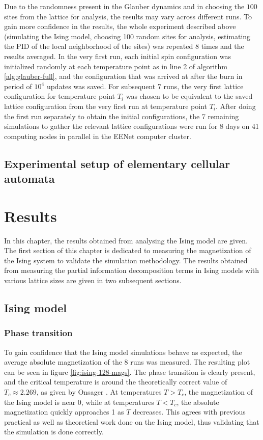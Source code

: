\documentclass[12pt]{article}
\begin{document}
Due to the randomness present in the Glauber dynamics and in choosing the $100$ sites from the lattice for analysis, the results may vary across different runs. To gain more confidence in the results, the whole experiment described above (simulating the Ising model, choosing 100 random sites for analysis, estimating the PID of the local neighborhood of the sites) was repeated 8 times and the results averaged. In the very first run, each initial spin configuration was initialized randomly at each temperature point as in line 2 of algorithm \ref{alg:glauber-full}, and the configuration that was arrived at after the burn in period of $10^4$ updates was saved. For subsequent 7 runs, the very first lattice configuration for temperature point $T_i$ was chosen to be equivalent to the saved lattice configuration from the very first run at temperature point $T_i$. After doing the first run separately to obtain the initial configurations, the 7 remaining simulations to gather the relevant lattice configurations were run for 8 days on 41 computing nodes in parallel in the EENet computer cluster.

\subsection{Experimental setup of elementary cellular automata}

\newpage
\section{Results}

In this chapter, the results obtained from analysing the Ising model are given. The first section of this chapter  is dedicated to measuring the magnetization of the Ising system to validate the simulation methodology. The results obtained from measuring the partial information decomposition terms in Ising models with various lattice sizes are given in two subsequent sections.

\subsection{Ising model}

\subsubsection{Phase transition} 

To gain confidence that the Ising model simulations behave as expected, the average absolute magnetization of the 8 runs was measured. The resulting plot can be seen in figure \ref{fig:ising-128-mags}. The phase transition is clearly present, and the critical temperature is around the theoretically correct value of $T_c \approx 2.269$, as given by Onsager \cite{lars-onsanger}. At temperatures $T > T_c$, the magnetization of the Ising model is near 0, while at temperatures $T < T_c$, the absolute magnetization quickly approaches 1 as $T$ decreases. This agrees with previous practical as well as theoretical work done on the Ising model, thus validating that the simulation is done correctly.
\end{document}
